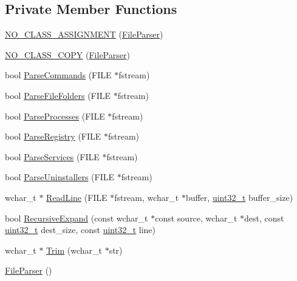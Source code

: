 \subsection*{Private Member Functions}
\begin{DoxyCompactItemize}
\item 
\hyperlink{class_file_parser_a24e4c684b9ae137492fdcb5d1e14b277}{N\-O\-\_\-\-C\-L\-A\-S\-S\-\_\-\-A\-S\-S\-I\-G\-N\-M\-E\-N\-T} (\hyperlink{class_file_parser}{File\-Parser})
\item 
\hyperlink{class_file_parser_aa22508ba901abdc8352b6ddb5465d389}{N\-O\-\_\-\-C\-L\-A\-S\-S\-\_\-\-C\-O\-P\-Y} (\hyperlink{class_file_parser}{File\-Parser})
\item 
bool \hyperlink{class_file_parser_afd60d90d19a0b845b78e6a97a4cc8a19}{Parse\-Commands} (F\-I\-L\-E $\ast$fstream)
\item 
bool \hyperlink{class_file_parser_ae5bcd49264484904f60df92e655893a6}{Parse\-File\-Folders} (F\-I\-L\-E $\ast$fstream)
\item 
bool \hyperlink{class_file_parser_a5fadcdd2bc121bf2f9d82bf97b595e9f}{Parse\-Processes} (F\-I\-L\-E $\ast$fstream)
\item 
bool \hyperlink{class_file_parser_a814684f4ded5f14659bdd4f2b6e86f6a}{Parse\-Registry} (F\-I\-L\-E $\ast$fstream)
\item 
bool \hyperlink{class_file_parser_a851ba6368db27ae7637261c63f309636}{Parse\-Services} (F\-I\-L\-E $\ast$fstream)
\item 
bool \hyperlink{class_file_parser_a17791774c8d7a3be3f82b9cea4b3be62}{Parse\-Uninstallers} (F\-I\-L\-E $\ast$fstream)
\item 
wchar\-\_\-t $\ast$ \hyperlink{class_file_parser_a3efe5270b0bd6bc32b6110f2d785b3f2}{Read\-Line} (F\-I\-L\-E $\ast$fstream, wchar\-\_\-t $\ast$buffer, \hyperlink{stdint_8h_a435d1572bf3f880d55459d9805097f62}{uint32\-\_\-t} buffer\-\_\-size)
\item 
bool \hyperlink{class_file_parser_ae7d9d085e1f36606ca35091fdc85129d}{Recursive\-Expand} (const wchar\-\_\-t $\ast$const source, wchar\-\_\-t $\ast$dest, const \hyperlink{stdint_8h_a435d1572bf3f880d55459d9805097f62}{uint32\-\_\-t} dest\-\_\-size, const \hyperlink{stdint_8h_a435d1572bf3f880d55459d9805097f62}{uint32\-\_\-t} line)
\item 
wchar\-\_\-t $\ast$ \hyperlink{class_file_parser_a097fc2243080762abcb86243dbff4645}{Trim} (wchar\-\_\-t $\ast$str)
\item 
\hyperlink{class_file_parser_acb58172b4650cd8015d5e8cad7d29647}{File\-Parser} ()
\end{DoxyCompactItemize}
